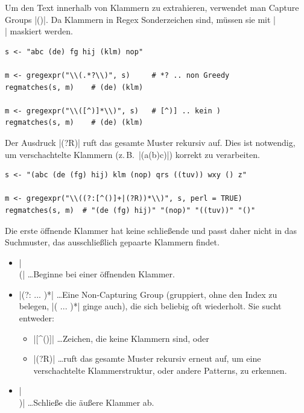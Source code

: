 \documentclass[10pt,twocolumn]{scrartcl}
\renewcommand{\lstinline}{\mycoloredinline}
\begin{document}
Um den Text innerhalb von Klammern zu extrahieren, verwendet man Capture Groups \lstinline|()|. Da Klammern in Regex Sonderzeichen sind, müssen sie mit \lstinline|\\| maskiert werden.

\begin{lstlisting}
s <- "abc (de) fg hij (klm) nop"

m <- gregexpr("\\(.*?\\)", s)     # *? .. non Greedy
regmatches(s, m)    # (de) (klm)

m <- gregexpr("\\([^)]*\\)", s)   # [^)] .. kein )
regmatches(s, m)    # (de) (klm)
\end{lstlisting}

Der Ausdruck \lstinline|(?R)| ruft das gesamte Muster rekursiv auf. Dies ist notwendig, um verschachtelte Klammern (z.\,B.\ \lstinline|(a(b)c)|) korrekt zu verarbeiten.

\begin{lstlisting}
s <- "(abc (de (fg) hij) klm (nop) qrs ((tuv)) wxy () z"

m <- gregexpr("\\((?:[^()]+|(?R))*\\)", s, perl = TRUE)
regmatches(s, m)  # "(de (fg) hij)" "(nop)" "((tuv))" "()"
\end{lstlisting}

Die erste öffnende Klammer hat keine schließende und passt daher nicht in das Suchmuster, das ausschließlich gepaarte Klammern findet.

\begin{itemize}
\item \lstinline|\\(| \dots Beginne bei einer öffnenden Klammer.
\item \lstinline|(?: ... )*| \dots Eine Non-Capturing Group (gruppiert, ohne den Index zu belegen, \lstinline|( ... )*| ginge auch), die sich beliebig oft wiederholt. Sie sucht entweder:
  \begin{itemize}
  \item \lstinline|[^()]| \dots Zeichen, die keine Klammern sind, oder
  \item \lstinline|(?R)| \dots ruft das gesamte Muster rekursiv erneut auf, um eine verschachtelte Klammerstruktur, oder andere Patterns, zu erkennen.
  \end{itemize}
\item \lstinline|\\)| \dots Schließe die äußere Klammer ab.
\end{itemize}
\end{document}
